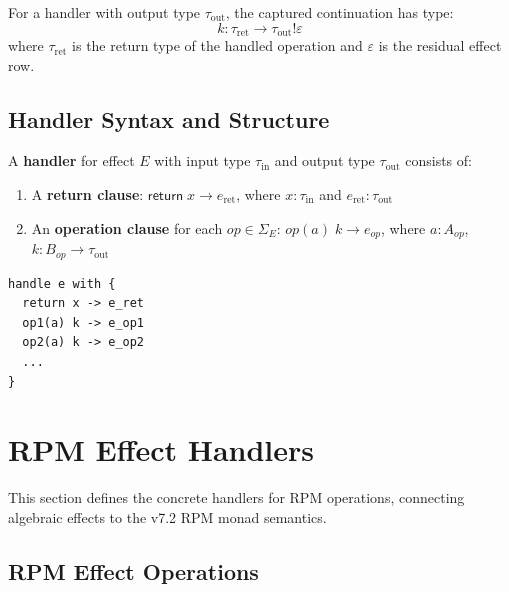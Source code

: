 \begin{definition}
\label{def:answer-type}
For a handler with output type $\tau_{\mathrm{out}}$, the captured continuation has type:
\[
k : \tau_{\mathrm{ret}} \to \tau_{\mathrm{out}} \mathbin{!} \varepsilon
\]
where $\tau_{\mathrm{ret}}$ is the return type of the handled operation and $\varepsilon$ is the residual effect row.
\end{definition}

\subsection{Handler Syntax and Structure}
\label{subsec:handler-structure}

\begin{definition}
\label{def:handler-def}
A \textbf{handler} for effect $E$ with input type $\tau_{\mathrm{in}}$ and output type $\tau_{\mathrm{out}}$ consists of:
\begin{enumerate}
  \item A \textbf{return clause}: $\mathsf{return}\; x \to e_{\mathrm{ret}}$, where $x : \tau_{\mathrm{in}}$ and $e_{\mathrm{ret}} : \tau_{\mathrm{out}}$
  \item An \textbf{operation clause} for each $\mathit{op} \in \Sigma_E$: $\mathit{op}(a)\; k \to e_{\mathit{op}}$, where $a : A_{\mathit{op}}$, $k : B_{\mathit{op}} \to \tau_{\mathrm{out}}$
\end{enumerate}
\end{definition}

\begin{definition}
\label{def:handler-expr-syntax}
\begin{verbatim}
handle e with {
  return x -> e_ret
  op1(a) k -> e_op1
  op2(a) k -> e_op2
  ...
}
\end{verbatim}
\end{definition}

\section{RPM Effect Handlers}
\label{sec:rpm-effect-handlers}

This section defines the concrete handlers for RPM operations, connecting algebraic effects to the v7.2 RPM monad semantics.

\subsection{RPM Effect Operations}
\label{subsec:rpm-effect-ops}

